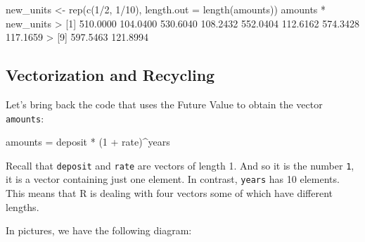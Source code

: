 \documentclass[
]{book}
\newenvironment{Shaded}{\begin{snugshade}}{\end{snugshade}}
\newcommand{\AttributeTok}[1]{\textcolor[rgb]{0.77,0.63,0.00}{#1}}
\newcommand{\DecValTok}[1]{\textcolor[rgb]{0.00,0.00,0.81}{#1}}
\newcommand{\FloatTok}[1]{\textcolor[rgb]{0.00,0.00,0.81}{#1}}
\newcommand{\FunctionTok}[1]{\textcolor[rgb]{0.00,0.00,0.00}{#1}}
\newcommand{\NormalTok}[1]{#1}
\newcommand{\OtherTok}[1]{\textcolor[rgb]{0.56,0.35,0.01}{#1}}
\newcommand{\SpecialCharTok}[1]{\textcolor[rgb]{0.00,0.00,0.00}{#1}}
\begin{document}
\begin{Shaded}
\begin{Highlighting}[]
\NormalTok{new\_units }\OtherTok{\textless{}{-}} \FunctionTok{rep}\NormalTok{(}\FunctionTok{c}\NormalTok{(}\DecValTok{1}\SpecialCharTok{/}\DecValTok{2}\NormalTok{, }\DecValTok{1}\SpecialCharTok{/}\DecValTok{10}\NormalTok{), }\AttributeTok{length.out =} \FunctionTok{length}\NormalTok{(amounts))}
\NormalTok{amounts }\SpecialCharTok{*}\NormalTok{ new\_units}
\SpecialCharTok{\textgreater{}}\NormalTok{  [}\DecValTok{1}\NormalTok{] }\FloatTok{510.0000} \FloatTok{104.0400} \FloatTok{530.6040} \FloatTok{108.2432} \FloatTok{552.0404} \FloatTok{112.6162} \FloatTok{574.3428} \FloatTok{117.1659}
\SpecialCharTok{\textgreater{}}\NormalTok{  [}\DecValTok{9}\NormalTok{] }\FloatTok{597.5463} \FloatTok{121.8994}
\end{Highlighting}
\end{Shaded}

\hypertarget{vectorization-and-recycling}{%
\subsection{Vectorization and Recycling}\label{vectorization-and-recycling}}

Let's bring back the code that uses the Future Value to obtain the vector
\texttt{amounts}:

\begin{Shaded}
\begin{Highlighting}[]
\NormalTok{amounts }\OtherTok{=}\NormalTok{ deposit }\SpecialCharTok{*}\NormalTok{ (}\DecValTok{1} \SpecialCharTok{+}\NormalTok{ rate)}\SpecialCharTok{\^{}}\NormalTok{years}
\end{Highlighting}
\end{Shaded}

Recall that \texttt{deposit} and \texttt{rate} are vectors of length 1. And so it is the
number \texttt{1}, it is a vector containing just one element. In contrast, \texttt{years}
has 10 elements. This means that R is dealing with four vectors some of which
have different lengths.

In pictures, we have the following diagram:
\end{document}
